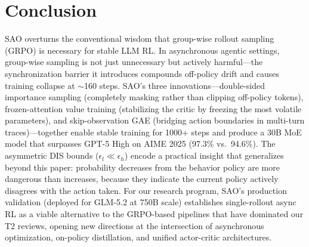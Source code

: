\documentclass[11pt,a4paper]{article}
\begin{document}
\section{Conclusion}

SAO overturns the conventional wisdom that group-wise rollout sampling (GRPO) is necessary for stable LLM RL. In asynchronous agentic settings, group-wise sampling is not just unnecessary but actively harmful---the synchronization barrier it introduces compounds off-policy drift and causes training collapse at $\sim$160 steps. SAO's three innovations---double-sided importance sampling (completely masking rather than clipping off-policy tokens), frozen-attention value training (stabilizing the critic by freezing the most volatile parameters), and skip-observation GAE (bridging action boundaries in multi-turn traces)---together enable stable training for 1000+ steps and produce a 30B MoE model that surpasses GPT-5 High on AIME 2025 (97.3\% vs.\ 94.6\%). The asymmetric DIS bounds ($\epsilon_l \ll \epsilon_h$) encode a practical insight that generalizes beyond this paper: probability decreases from the behavior policy are more dangerous than increases, because they indicate the current policy actively disagrees with the action taken. For our research program, SAO's production validation (deployed for GLM-5.2 at 750B scale) establishes single-rollout async RL as a viable alternative to the GRPO-based pipelines that have dominated our T2 reviews, opening new directions at the intersection of asynchronous optimization, on-policy distillation, and unified actor-critic architectures.
\end{document}
